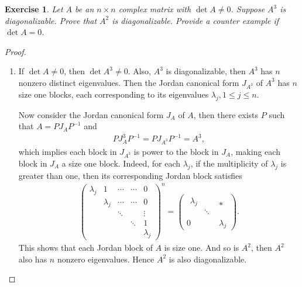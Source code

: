 \documentclass[11pt]{book}
\newtheorem{exercise}{Exercise}[section]
\theoremstyle{definition}
\numberwithin{equation}{chapter}
\begin{document}
\begin{exercise}
Let $A$ be an $n \times n$ complex matrix with $\det A \neq 0$. Suppose $A^3$ is diagonalizable. Prove that $A^2$ is diagonalizable. Provide a counter example if $\det A = 0$.
\end{exercise}
\begin{proof}
~\begin{enumerate}[label=(\alph*)]
    \item If $\det A \neq 0$, then $\det A^3 \neq 0$. Also, $A^3$ is diagonalizable, then $A^3$ has $n$ nonzero distinct eigenvalues. Then the Jordan canonical form $J_{A^3}$ of $A^3$ has $n$ size one blocks, each corresponding to its eigenvalues $\lambda_j, 1\leq j \leq n$. 
    
    Now consider the Jordan canonical form $J_{A}$ of $A$, then there exists $P$ such that $A = P J_{A} P^{-1}$ and 
    \begin{align*}
        P J_A^3 P^{-1} = P J_{A^3} P^{-1} = A^3,
    \end{align*}
    which implies each block in $J_{A^3}$ is power to the block in $J_A$, making each block in $J_A$ a size one block\cite{1}. Indeed, for each $\lambda_j$, if the multiplicity of $\lambda_j$ is greater than one, then its corresponding Jordan block satisfies\cite{2}
    \begin{align*}
        \begin{pmatrix}
            \lambda_j & 1         & \cdots & \cdots & 0 \\
                      & \lambda_j & \cdots & \cdots & 0 \\
                      &           & \ddots &        & \vdots \\
                      &           &        & \ddots & 1 \\
                      &           &        &        & \lambda_j
        \end{pmatrix}^n = 
        \begin{pmatrix}
            \begin{array}{cc}\lambda_j & \\ & \ddots \end{array} & * \\
            0 & \lambda_j
        \end{pmatrix}.
    \end{align*}
    This shows that each Jordan block of $A$ is size one. And so is $A^2$, then $A^2$ also has $n$ nonzero eigenvalues. Hence $A^2$ is also diagonalizable. 
    

\end{enumerate}
\end{proof}
\end{document}
